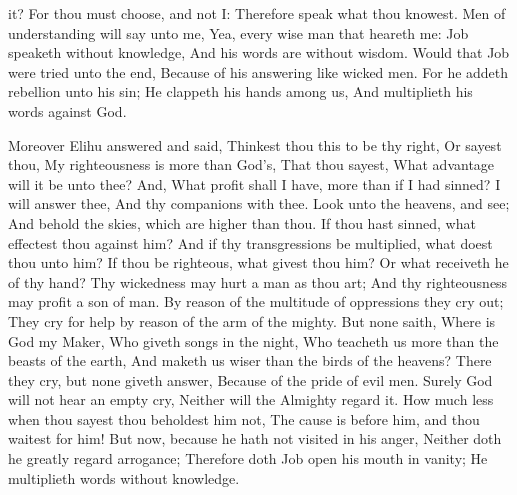 it? For thou must choose, and not I: Therefore speak what thou knowest.  Men of understanding will say unto me, Yea, every wise man that heareth me:  Job speaketh without knowledge, And his words are without wisdom.  Would that Job were tried unto the end, Because of his answering like wicked men.  For he addeth rebellion unto his sin; He clappeth his hands among us, And multiplieth his words against God. 

Moreover Elihu answered and said,  Thinkest thou this to be thy right, Or sayest thou, My righteousness is more than God’s,  That thou sayest, What advantage will it be unto thee? And, What profit shall I have, more than if I had sinned?  I will answer thee, And thy companions with thee.  Look unto the heavens, and see; And behold the skies, which are higher than thou.  If thou hast sinned, what effectest thou against him? And if thy transgressions be multiplied, what doest thou unto him?  If thou be righteous, what givest thou him? Or what receiveth he of thy hand?  Thy wickedness may hurt a man as thou art; And thy righteousness may profit a son of man.  By reason of the multitude of oppressions they cry out; They cry for help by reason of the arm of the mighty.  But none saith, Where is God my Maker, Who giveth songs in the night,  Who teacheth us more than the beasts of the earth, And maketh us wiser than the birds of the heavens?  There they cry, but none giveth answer, Because of the pride of evil men.  Surely God will not hear an empty cry, Neither will the Almighty regard it.  How much less when thou sayest thou beholdest him not, The cause is before him, and thou waitest for him!  But now, because he hath not visited in his anger, Neither doth he greatly regard arrogance;  Therefore doth Job open his mouth in vanity; He multiplieth words without knowledge. 

